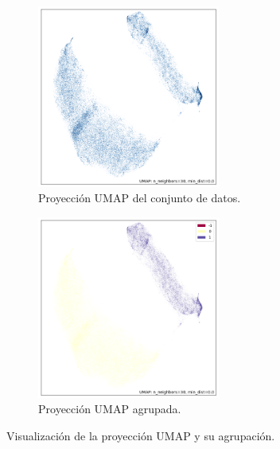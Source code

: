 \begin{figure}[H]
    \centering
    \begin{subfigure}[b]{0.45\textwidth}
        \centering
        \includegraphics[height=6cm]{img/cleaning-data/umap.png}
        \caption{Proyección UMAP del conjunto de datos.}
        \label{fig:umap}
    \end{subfigure}
    \hfill
    \begin{subfigure}[b]{0.45\textwidth}
        \centering
        \includegraphics[height=6cm]{img/cleaning-data/umap-clusterizado.png}
        \caption{Proyección UMAP agrupada.}
        \label{fig:umap-clusterizado}
    \end{subfigure}
    \caption{Visualización de la proyección UMAP y su agrupación.}
    \label{fig:umap-example}
\end{figure}

